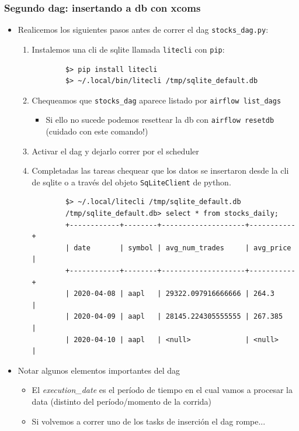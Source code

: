 \documentclass[leqno, 10pt, envcountsect]{beamer}
\numberwithin{equation}{section}
\theoremstyle{definition}
\theoremstyle{example}
\numberwithin{figure}{section}
\numberwithin{table}{section}
\let\olditem\item
\renewcommand{\item}{%
\olditem\vspace{1pt}}
\begin{document}
\begin{frame}[fragile=singleslide]
  \frametitle{Segundo dag: insertando a db con xcoms}
  \begin{itemize}
    \item Realicemos los siguientes pasos antes de correr el dag
      \texttt{stocks_dag.py}:
      \begin{enumerate}
        \item Instalemos una cli de sqlite llamada \texttt{litecli} con \texttt{pip}:
        \begin{verbatim}
        $> pip install litecli
        $> ~/.local/bin/litecli /tmp/sqlite_default.db
        \end{verbatim}
      \item Chequeamos que \texttt{stocks_dag} aparece listado por
        \texttt{airflow list_dags}
        \begin{itemize}
          \item Si ello no sucede podemos resettear la db con \texttt{airflow
            resetdb} (cuidado con este comando!)
        \end{itemize}
      \item Activar el dag y dejarlo correr por el scheduler
      \item Completadas las tareas chequear que los datos se insertaron desde
        la cli de sqlite o a través del objeto \texttt{SqLiteClient} de python.
        \begin{verbatim}
        $> ~/.local/litecli /tmp/sqlite_default.db
        /tmp/sqlite_default.db> select * from stocks_daily;
        +------------+--------+--------------------+-----------+
        | date       | symbol | avg_num_trades     | avg_price |
        +------------+--------+--------------------+-----------+
        | 2020-04-08 | aapl   | 29322.097916666666 | 264.3     |
        | 2020-04-09 | aapl   | 28145.224305555555 | 267.385   |
        | 2020-04-10 | aapl   | <null>             | <null>    |
        \end{verbatim}
      \end{enumerate}
    \item Notar algunos elementos importantes del dag
      \begin{itemize}
        \item El \textit{execution_date} es el período de tiempo en el cual
          vamos a procesar la data (distinto del período/momento de la corrida)
        \item Si volvemos a correr uno de los tasks de inserción el dag
          rompe...
      \end{itemize}
  \end{itemize}
\end{frame}
\end{document}
